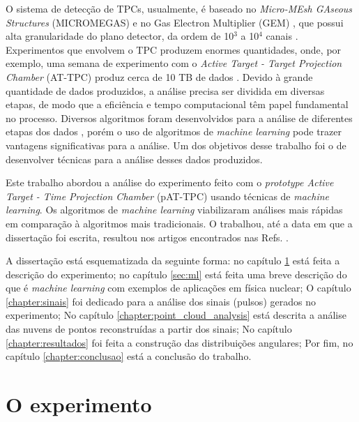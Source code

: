 \documentclass[a4paper,12pt,oneside]{book}
\begin{document}
\par O sistema de detecção de TPCs, usualmente, é baseado no \textit{Micro-MEsh GAseous Structures} (MICROMEGAS) \cite{micromegas} e no 
Gas Electron Multiplier (GEM) \cite{GET}, que possui alta granularidade do plano detector, da ordem de 10$^3$ a 10$^4$ canais \cite{FORTINO2022166497}. Experimentos que envolvem o TPC produzem enormes quantidades, onde, por exemplo, uma semana de experimento com o \textit{Active Target - Target Projection Chamber} (AT-TPC) produz cerca de 10 TB de dados \cite{attpc, pattpc}. Devido à grande quantidade de dados produzidos, a análise precisa ser dividida em diversas etapas, de modo que a eficiência e tempo computacional têm papel fundamental no processo. Diversos algoritmos foram desenvolvidos para a análise de diferentes etapas dos dados \cite{FORTINO2022166497, artigo}, porém o uso de algoritmos de \textit{machine learning} pode trazer vantagens significativas para a análise. Um dos objetivos desse trabalho foi o de desenvolver técnicas para a análise desses dados produzidos.

\par Este trabalho abordou a análise do experimento feito com o \textit{prototype Active Target - Time Projection Chamber} (pAT-TPC) \cite{pattpc} usando técnicas de \textit{machine learning}. Os algoritmos de \textit{machine learning} viabilizaram análises mais rápidas em comparação à algoritmos mais tradicionais. O trabalhou, até a data em que a dissertação foi escrita, resultou nos artigos encontrados nas Refs. \cite{artigo, FORTINO2022166497}.

\par A dissertação está esquematizada da seguinte forma: no capítulo \ref{PATTPC} está feita a descrição do experimento; no capítulo \ref{sec:ml} está feita uma breve descrição do que é \textit{machine learning} com exemplos de aplicações em física nuclear; O capítulo \ref{chapter:sinais} foi dedicado para a análise dos sinais (pulsos) gerados no experimento; No capítulo \ref{chapter:point_cloud_analysis} está descrita a análise das nuvens de pontos reconstruídas a partir dos sinais; No capítulo \ref{chapter:resultados} foi feita a construção das distribuições angulares; Por fim, no capítulo \ref{chapter:conclusao} está a conclusão do trabalho.

\chapter{O experimento}\label{PATTPC}
\end{document}
